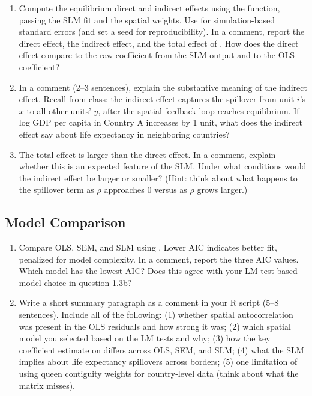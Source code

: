 \begin{enumerate}[label=\alph*)]

  \item Compute the equilibrium direct and indirect effects using the  function, passing the SLM fit and the spatial weights. Use  for simulation-based standard errors (and set a seed for reproducibility). In a comment, report the direct effect, the indirect effect, and the total effect of . How does the direct effect compare to the raw  coefficient from the SLM output and to the OLS coefficient?

  \item In a comment (2--3 sentences), explain the substantive meaning of the indirect effect. Recall from class: the indirect effect captures the spillover from unit $i$'s $x$ to all other units' $y$, after the spatial feedback loop reaches equilibrium. If log GDP per capita in Country A increases by 1 unit, what does the indirect effect say about life expectancy in neighboring countries?

  \item The total effect is larger than the direct effect. In a comment, explain whether this is an expected feature of the SLM. Under what conditions would the indirect effect be larger or smaller? (Hint: think about what happens to the spillover term as $\rho$ approaches 0 versus as $\rho$ grows larger.)

\end{enumerate}

\subsection{Model Comparison}

\begin{enumerate}[label=\alph*)]

  \item Compare OLS, SEM, and SLM using . Lower AIC indicates better fit, penalized for model complexity. In a comment, report the three AIC values. Which model has the lowest AIC? Does this agree with your LM-test-based model choice in question 1.3b?

  \item Write a short summary paragraph as a comment in your R script (5--8 sentences). Include all of the following: (1) whether spatial autocorrelation was present in the OLS residuals and how strong it was; (2) which spatial model you selected based on the LM tests and why; (3) how the key coefficient estimate on  differs across OLS, SEM, and SLM; (4) what the SLM implies about life expectancy spillovers across borders; (5) one limitation of using queen contiguity weights for country-level data (think about what the matrix misses).

\end{enumerate}

